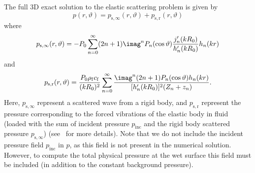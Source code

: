 The full 3D exact solution to the elastic scattering problem is given by
\begin{equation}\label{Eq2:exact3DscatteringSphericalShellSol}
	p(r,\vartheta) = p_{\mathrm{s},\infty}(r,\vartheta) + p_{\mathrm{s},\mathrm{r}}(r,\vartheta)
\end{equation}
where
\begin{equation*}
	p_{\mathrm{s},\infty}(r,\vartheta) = -P_0\sum_{n=0}^\infty (2n+1)\imag^n P_n(\cos\vartheta) \frac{j_n'(kR_0)}{h_n'(kR_0)}h_n(kr)
\end{equation*}
and
\begin{equation*}
	p_{\mathrm{s},\mathrm{r}}(r,\vartheta) = \frac{P_0\rho_{\mathrm{f}} c_{\mathrm{f}}}{(kR_0)^2}\sum_{n=0}^\infty \frac{\imag^n(2n+1)P_n(\cos\vartheta)h_n(kr)}{[h_n'(kR_0)]^2(Z_n+z_n)}.
\end{equation*}
Here, $p_{\mathrm{s},\infty}$ represent a scattered wave from a rigid body, and $p_{\mathrm{s},\mathrm{r}}$ represent the pressure corresponding to the forced vibrations of the elastic body in fluid (loaded with the sum of incident pressure $p_{\mathrm{inc}}$ and the rigid body scattered pressure $p_{\mathrm{s},\infty}$) (see~\cite[p. 2]{Chang1994voa} for more details). Note that we do not include the incident pressure field $p_{\mathrm{inc}}$ in $p$, as this field is not present in the numerical solution. However, to compute the total physical pressure at the wet surface this field must be included (in addition to the constant background pressure).
